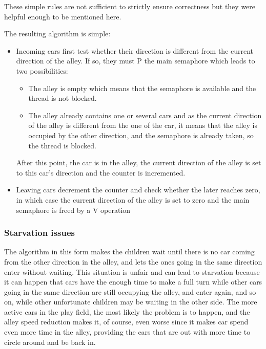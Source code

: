 These simple rules are not sufficient to strictly ensure correctness but they
were helpful enough to be mentioned here.

The resulting algorithm is simple: 
\begin{itemize}
    \item Incoming cars first test whether their direction is different from the
    current direction of the alley. If so, they must P the main semaphore which
    leads to two possibilities:
    \begin{itemize}
        \item The alley is empty which means that the semaphore is available and
        the thread is not blocked.
        \item The alley already contains one or several cars and as the current
        direction of the alley is different from the one of the car, it means
        that the alley is occupied by the other direction, and the semaphore is
        already taken, so the thread is blocked.
    \end{itemize}
    After this point, the car is in the alley, the current direction of the
    alley is set to this car's direction and the counter is incremented.
    \item Leaving cars decrement the counter and check whether the later
    reaches zero, in which case the current direction of the alley is set to
    zero and the main semaphore is freed by a V operation
\end{itemize}

\subsubsection{Starvation issues}

The algorithm in this form makes the children wait until there is no car coming
from the other direction in the alley, and lets the ones going in the same
direction enter without waiting. This situation is unfair and can lead to
starvation because it can happen that cars have the enough time to make a full
turn while other cars going in the same direction are still occupying the alley,
and enter again, and so on, while other unfortunate children may be waiting in
the other side. The more active cars in the play field, the most likely the
problem is to happen, and the alley speed reduction makes it, of course, even
worse since it makes car spend even more time in the alley, providing the cars
that are out with more time to circle around and be back in.

